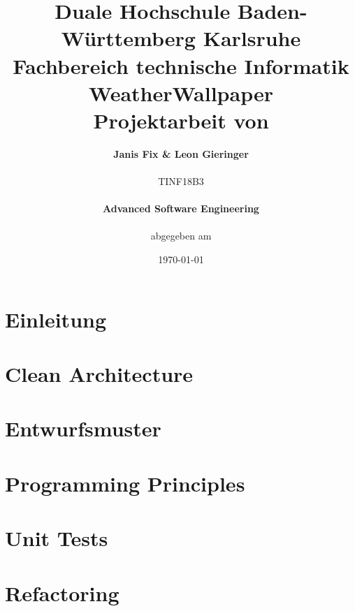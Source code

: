 \documentclass[11pt,a4paper]{article}
\title{\normalsize{Duale Hochschule Baden-Württemberg Karlsruhe}\\
	Fachbereich technische Informatik\\ \vspace{2cm}
	\huge{\textbf{WeatherWallpaper}\\ \vspace{2cm}
	\normalsize{Projektarbeit} von\\
}}
\author{\textbf{Janis Fix \& Leon Gieringer} \\ \vspace{2cm} \\
	TINF18B3 \\ \\
	\textbf{Advanced Software Engineering} \\ \vspace{2cm} \\
	abgegeben am
}
\date{\today}
\begin{document}
	\maketitle
	\thispagestyle{empty}
	\newpage
	
	\tableofcontents
	\newpage
	\listoffigures
	\newpage
	\listoflistings
	\newpage
	
	
	\pagestyle{fancy}
	\fancyhf{}
	\setlength{\headheight}{35pt}
	\cfoot{\thepage}
	\newpage
	
	
	\section{Einleitung}
	
	\clearpage
	
	\section{Clean Architecture}
	
	\clearpage
	\section{Entwurfsmuster}
	
	\clearpage
	\section{Programming Principles}
	
	\clearpage
	\section{Unit Tests}
	
	\clearpage
	\section{Refactoring}
	
	
	
	
	
	
\end{document}

